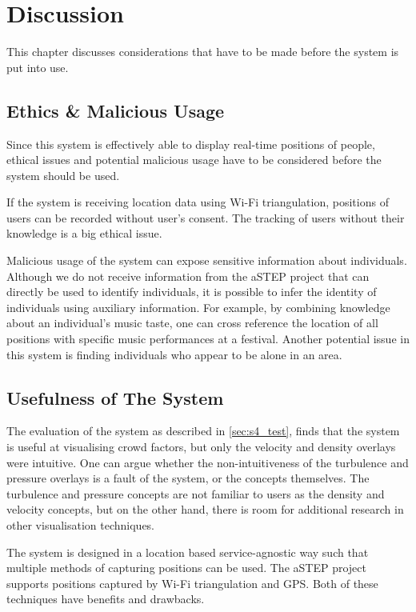 \chapter{Discussion}\label{ch:discussion}

This chapter discusses considerations that have to be made before the system is put into use.

\section{Ethics \& Malicious Usage}
Since this system is effectively able to display real-time positions of people, ethical issues and potential malicious usage have to be considered before the system should be used. 

If the system is receiving location data using Wi-Fi triangulation, positions of users can be recorded without user's consent. The tracking of users without their knowledge is a big ethical issue.

Malicious usage of the system can expose sensitive information about individuals. Although we do not receive information from the aSTEP project that can directly be used to identify individuals, it is possible to infer the identity of individuals using auxiliary information. For example, by combining knowledge about an individual's music taste, one can cross reference the location of all positions with specific music performances at a festival. Another potential issue in this system is finding individuals who appear to be alone in an area. 

\section{Usefulness of The System}
The evaluation of the system as described in \cref{sec:s4_test}, finds that the system is useful at visualising crowd factors, but only the velocity and density overlays were intuitive. One can argue whether the non-intuitiveness of the turbulence and pressure overlays is a fault of the system, or the concepts themselves. The turbulence and pressure concepts are not familiar to users as the density and velocity concepts, but on the other hand, there is room for additional research in other visualisation techniques.


The system is designed in a location based service-agnostic way such that multiple methods of capturing positions can be used. The aSTEP project supports positions captured by Wi-Fi triangulation and GPS. Both of these techniques have benefits and drawbacks.

